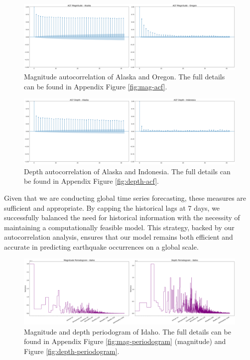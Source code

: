 \begin{figure}[hbtp]
  \centering
  \includegraphics[scale=0.2]{img/magnitude-acf-sample.png}
  \captionsetup{format=hang}
  \caption{\label{fig:mag-acf-sample}Magnitude autocorrelation of Alaska and Oregon.
    The full details can be found in Appendix Figure \ref{fig:mag-acf}.}
\end{figure}

\begin{figure}[hbtp]
  \centering
  \includegraphics[scale=0.2]{img/depth-acf-sample.png}
  \captionsetup{format=hang}
  \caption{\label{fig:depth-acf-sample}Depth autocorrelation of Alaska and Indonesia.
    The full details can be found in Appendix Figure \ref{fig:depth-acf}.}
\end{figure}

Given that we are conducting global time series forecasting, these measures are
sufficient and appropriate. By capping the historical lags at 7 days, we successfully
balanced the need for historical information with the necessity of maintaining a
computationally feasible model. This strategy, backed by our autocorrelation analysis,
ensures that our model remains both efficient and accurate in predicting earthquake
occurrences on a global scale.

\begin{figure}[hbtp]
  \centering
  \includegraphics[scale=0.2]{img/periodogram-sample.png}
  \captionsetup{format=hang}
  \caption{\label{fig:periodogram-sample}Magnitude and depth periodogram of Idaho.
    The full details can be found in Appendix Figure \ref{fig:mag-periodogram} (magnitude)
    and Figure \ref{fig:depth-periodogram}.}
\end{figure}

